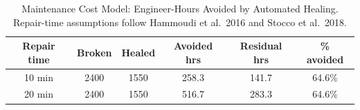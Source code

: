 \begin{table}[H]
\centering
\caption{Maintenance Cost Model: Engineer-Hours Avoided by Automated Healing. Repair-time assumptions follow Hammoudi et al.\ 2016 and Stocco et al.\ 2018.}
\label{tab:cost_model}
\begin{tabular}{cccccc}
\toprule
Repair time & Broken & Healed & Avoided hrs & Residual hrs & \% avoided \\
\midrule
10 min & 2400 & 1550 & 258.3 & 141.7 & 64.6\% \\
20 min & 2400 & 1550 & 516.7 & 283.3 & 64.6\% \\
\bottomrule
\end{tabular}
\end{table}